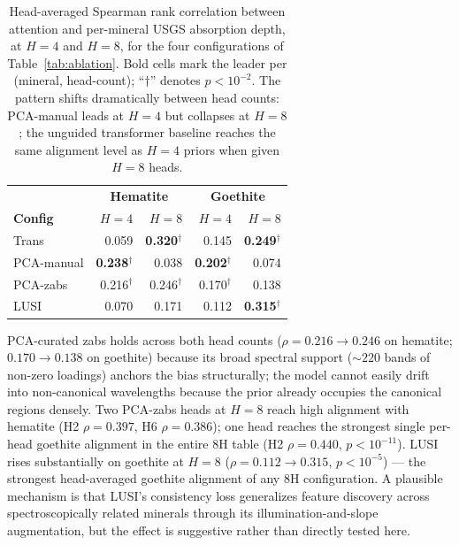 \documentclass[11pt]{report}
\begin{document}
\begin{table}[!htbp]
\centering
\small
\caption{Head-averaged Spearman rank correlation between attention and per-mineral USGS absorption depth, at $H = 4$ and $H = 8$, for the four configurations of Table~\ref{tab:ablation}. Bold cells mark the leader per (mineral, head-count); ``$\dagger$'' denotes $p < 10^{-2}$. The pattern shifts dramatically between head counts: PCA-manual leads at $H = 4$ but collapses at $H = 8$; the unguided transformer baseline reaches the same alignment level as $H = 4$ priors when given $H = 8$ heads.}
\label{tab:spearman_attn_4v8}
\begin{tabular}{lrrrr}
\hline
\rowcolor[gray]{0.85}
                  & \multicolumn{2}{c}{\textbf{Hematite}} & \multicolumn{2}{c}{\textbf{Goethite}} \\
\rowcolor[gray]{0.85}
\textbf{Config}   & \textbf{$H = 4$} & \textbf{$H = 8$} & \textbf{$H = 4$} & \textbf{$H = 8$} \\
\hline
Trans             & 0.059                       & \textbf{0.320}$^{\dagger}$  & 0.145                       & \textbf{0.249}$^{\dagger}$  \\
\hline
PCA-manual        & \textbf{0.238}$^{\dagger}$  & 0.038                       & \textbf{0.202}$^{\dagger}$  & 0.074                       \\
\hline
PCA-zabs          & 0.216$^{\dagger}$           & 0.246$^{\dagger}$           & 0.170$^{\dagger}$           & 0.138                       \\
\hline
LUSI              & 0.070                       & 0.171                       & 0.112                       & \textbf{0.315}$^{\dagger}$  \\
\hline
\end{tabular}
\end{table}

PCA-curated zabs holds across both head counts ($\rho = 0.216 \to 0.246$ on hematite; $0.170 \to 0.138$ on goethite) because its broad spectral support ($\sim 220$ bands of non-zero loadings) anchors the bias structurally; the model cannot easily drift into non-canonical wavelengths because the prior already occupies the canonical regions densely. Two PCA-zabs heads at $H = 8$ reach high alignment with hematite (H2 $\rho = 0.397$, H6 $\rho = 0.386$); one head reaches the strongest single per-head goethite alignment in the entire 8H table (H2 $\rho = 0.440$, $p < 10^{-11}$). LUSI rises substantially on goethite at $H = 8$ ($\rho = 0.112 \to 0.315$, $p < 10^{-5}$) --- the strongest head-averaged goethite alignment of any 8H configuration. A plausible mechanism is that LUSI's consistency loss generalizes feature discovery across spectroscopically related minerals through its illumination-and-slope augmentation, but the effect is suggestive rather than directly tested here.
\end{document}
